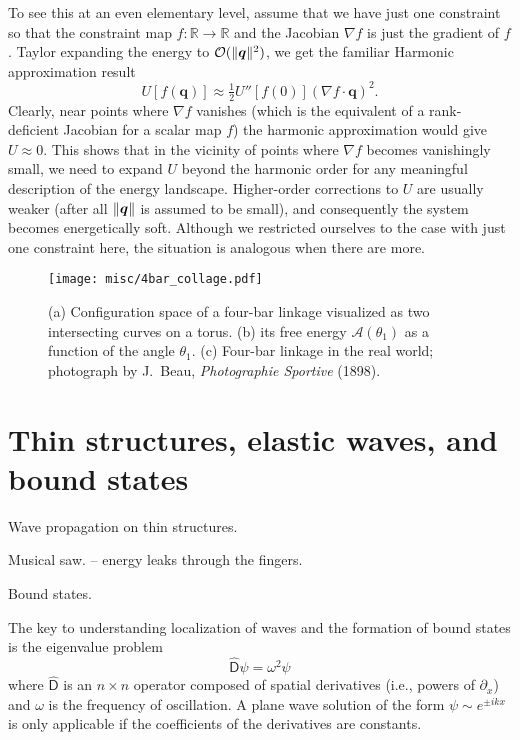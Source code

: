 To see this at an even elementary level, assume that we have just one constraint so that the constraint map $f: \mathbb{R} \to \mathbb{R}$ and the Jacobian $\nabla f$ is just the gradient of $f$.
Taylor expanding the energy to $\mathcal{O}(\lVert\bm{q}\rVert^{2})$, we get the familiar Harmonic approximation result
%
\begin{equation}
  U[f(\bm{q})] \approx \tfrac{1}{2}U''\left[f(0)\right]\left(\nabla f\cdot \bm{q}\right)^{2}.
\end{equation}
%
Clearly, near points where $\nabla f$ vanishes (which is the equivalent of a rank-deficient Jacobian for a scalar map $f$) the harmonic approximation would give $U \approx 0$.
This shows that in the vicinity of points where $\nabla f$ becomes vanishingly small, we need to expand $U$ beyond the harmonic order for any meaningful description of the energy landscape.
Higher-order corrections to $U$ are usually weaker (after all $\lVert\bm{q}\rVert$ is assumed to be small), and consequently the system becomes energetically soft.
Although we restricted ourselves to the case with just one constraint here, the situation is analogous when there are more.

\begin{figure}
  \begin{center}
    \texttt{[image: misc/4bar\_collage.pdf]}
  \end{center}
\caption{(a) Configuration space of a four-bar linkage visualized as two intersecting curves on a torus. (b) its free energy $\mathscr{A}(\theta_{1})$ as a function of the angle $\theta_{1}$. (c) Four-bar linkage in the real world; photograph by J.~Beau, \emph{Photographie Sportive} (1898).}
  \label{fig:4bar_collage}
\end{figure}


\section{Thin structures, elastic waves, and bound states}

Wave propagation on thin structures.

Musical saw. -- energy leaks through the fingers.

Bound states.

The key to understanding localization of waves and the formation of bound states is the eigenvalue problem
%
\begin{equation}
  \hat{\mathsf{D}}\psi = \omega^{2}\psi
\end{equation}
%
where $\hat{\mathsf{D}}$ is an $n\times n$ operator composed of spatial derivatives (i.e., powers of $\partial_x$) and $\omega$ is the frequency of oscillation.
A plane wave solution of the form $\psi \sim e^{\pm i kx}$ is only applicable if the coefficients of the derivatives are constants.

